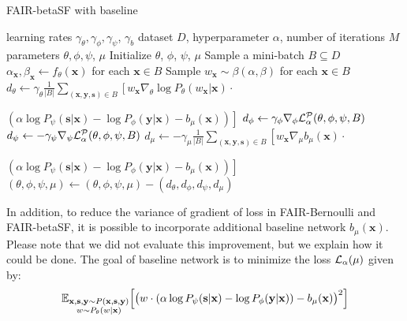\documentclass[preprint,12pt]{elsarticle}
\begin{document}
\begin{algorithm}[h!]
	\caption{FAIR-betaSF with baseline}
	\label{alg:beta-base}
	\begin{algorithmic}
		 learning rates $\gamma_\theta, \gamma_\phi, \gamma_\psi$, $\gamma_b$ dataset $D$,  hyperparameter $\alpha$, number of iterations $M$
		 parameters $\theta,\phi,\psi$, $\mu$
		\vspace{2mm}
		\State Initialize $\theta$, $\phi$, $\psi$, $\mu$
		\State Sample a mini-batch $B\subseteq D$
		\State $\alpha_\mathbf{x},\beta_\mathbf{x}\leftarrow f_\theta(\mathbf{x})$ for each $\mathbf{x}\in B$
		\State Sample $w_\mathbf{x}\sim \beta(\alpha,\beta)$ for each $\mathbf{x}\in B$
		\State $d_{\theta} \leftarrow \gamma_\theta\frac{1}{|B|} \sum_{(\mathbf{x},\mathbf{y},\mathbf{s})\in B}\left[w_\mathbf{x}\nabla_{\theta}\log P_\theta(w_\mathbf{x}|\mathbf{x})\cdot\right.$
		
		\hspace{1.5cm}$\left.(\alpha\log P_\psi(\mathbf{s}|\mathbf{x})-\log P_\phi(\mathbf{y}|\mathbf{x})-b_\mu(\textbf{x}))\right]$
		\State $d_{\phi} \leftarrow \gamma_\phi\nabla_{\phi}{\cal L}^{\cal P}_\alpha(\theta,\phi,\psi,B)$
		\State $d_{\psi} \leftarrow -\gamma_\psi\nabla_{\psi}{\cal L}^{\cal P}_\alpha(\theta,\phi,\psi,B)$
		\State $d_{\mu} \leftarrow -\gamma_\mu\frac{1}{|B|} \sum_{(\mathbf{x},\mathbf{y},\mathbf{s})\in B}\left[w_\mathbf{x}\nabla_\mu b_\mu(\mathbf{x})\cdot\right.$
		
		\hspace{1.5cm}$\left.(\alpha\log P_\psi(\mathbf{s}|\mathbf{x})-\log P_\phi(\mathbf{y}|\mathbf{x}) - b_\mu(\mathbf{x}))\right]$
		\State $(\theta,\phi,\psi,\mu) \leftarrow (\theta,\phi,\psi,\mu) - (d_{\theta},d_{\phi}, d_{\psi},  d_{\mu})$
		\EndFor
	\end{algorithmic}
\end{algorithm}


\iffalse
In addition, to reduce the variance of gradient of loss in FAIR-Bernoulli and FAIR-betaSF, it is possible to incorporate additional baseline network $b_\mu(\mathbf{x})$. Please note that we did not evaluate this improvement, but we explain how it could be done. The goal of baseline network is to minimize the loss ${\cal L}_{\alpha}(\mu)$ given by:
\begin{equation}
\label{Eq.Baseline-loss}
\mathbb{E}_{\substack{\mathbf{x}, \mathbf{s}, \mathbf{y}\sim P(\mathbf{x},\mathbf{s}, \mathbf{y})\\w \sim P_\theta(w|\mathbf{x})}} \Big[ \vphantom{)^2}\big(
w \cdot ( \alpha \log P_\psi(\mathbf{s}|\mathbf{x}) - \log P_\phi(\mathbf{y}|\mathbf{x})) - b_\mu(\mathbf{x})\big)^2 \Big]
\end{equation}
\end{document}
